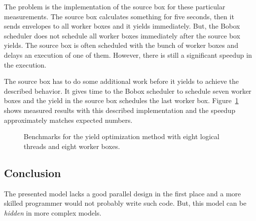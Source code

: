 The problem is the implementation of the source box for these particular measurements. The source box calculates something for five seconds, then it sends envelopes to all worker boxes and it yields immediately. But, the Bobox scheduler does not schedule all worker boxes immediately after the source box yields. The source box is often scheduled with the bunch of worker boxes and delays an execution of one of them. However, there is still a significant speedup in the execution.

The source box has to do some additional work before it yields to achieve the described behavior. It gives time to the Bobox scheduler to schedule seven worker boxes and the yield in the source box schedules the last worker box. Figure~\ref{yield-bench-better} shows measured results with this described implementation and the speedup approximately matches expected numbers.

\begin{figure}[h!]
\vspace{.5cm}
\centering
\caption{Benchmarks for the yield optimization method with eight logical threads and eight worker boxes.}
\label{yield-bench-better}
\end{figure}

\subsection{Conclusion}
The presented model lacks a good parallel design in the first place and a more skilled programmer would not probably write such code. But, this model can be \textit{hidden} in more complex models.

